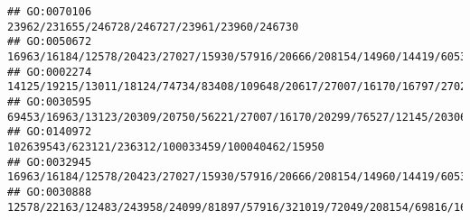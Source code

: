 \documentclass[
]{article}
\begin{document}
\begin{verbatim}
## GO:0070106                                                                                                                                                                                                                                                                                                                                                                23962/231655/246728/246727/23961/23960/246730
## GO:0050672                                                                                                                                                                                                                                                                                                                   16963/16184/12578/20423/27027/15930/57916/20666/208154/14960/14419/60533/58205/20371/12229
## GO:0002274                                                                                                                                                                                                                                                 14125/19215/13011/18124/74734/83408/109648/20617/27007/16170/16797/27027/14128/11988/17394/81897/20304/16364/13421/75766/11629/24108/12326/74481/14126/12229
## GO:0030595                                                                                                                                                                                                                                                           69453/16963/13123/20309/20750/56221/27007/16170/20299/76527/12145/20306/20307/20304/20303/12775/21943/110168/321019/245195/12458/11629/16149/12766
## GO:0140972                                                                                                                                                                                                                                                                                                                                                            102639543/623121/236312/100033459/100040462/15950
## GO:0032945                                                                                                                                                                                                                                                                                                                   16963/16184/12578/20423/27027/15930/57916/20666/208154/14960/14419/60533/58205/20371/12229
## GO:0030888                                                                                                                                                                                                                                                                                                                             12578/22163/12483/243958/24099/81897/57916/321019/72049/208154/69816/16149/12229

\end{verbatim}
\end{document}
